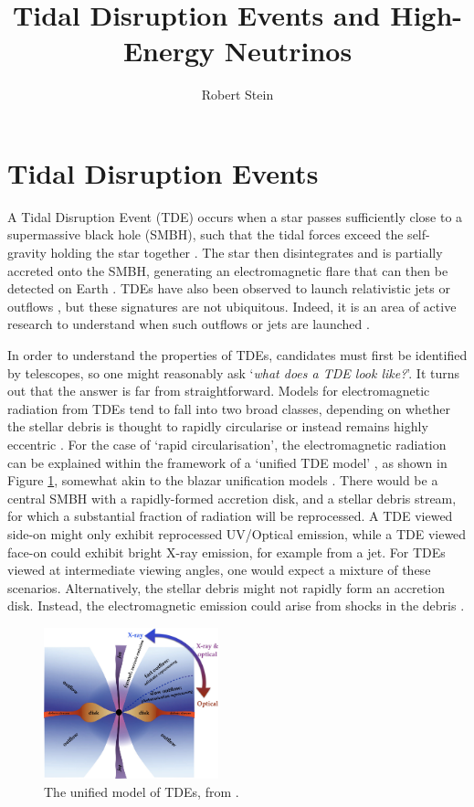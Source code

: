 \documentclass[a4paper,11pt]{article}
\title{Tidal Disruption Events and High-Energy Neutrinos}
\author*[a, b]{Robert Stein}
\affiliation[a]{Deutsches Elektronen-Synchrotron DESY: Zeuthen, Germany}
\affiliation[b]{Institut f\"ur Physik, Humboldt-Universit\"at zu Berlin: Berlin, Germany}
\begin{document}
\maketitle


\section{Tidal Disruption Events}

A Tidal Disruption Event (TDE) occurs when a star passes sufficiently close to a supermassive black hole (SMBH), such that the tidal forces exceed the self-gravity holding the star together \cite{rees_tde_88}. The star then disintegrates and is partially accreted onto the SMBH, generating an electromagnetic flare that can then be detected on Earth \cite{gezari_21}. TDEs have also been observed to launch relativistic jets \cite{swift_j1644_11} or outflows \cite{van_velzen_16, alexander_16, radio_tde_summary}, but these signatures are not ubiquitous. Indeed, it is an area of active research to understand when such outflows or jets are launched \cite{radio_tde_summary}.

In order to understand the properties of TDEs, candidates must first be identified by telescopes, so one might reasonably ask `\emph{what does a TDE look like?}'. It turns out that the answer is far from straightforward. Models for electromagnetic radiation from TDEs tend to fall into two broad classes, depending on whether the stellar debris is thought to rapidly circularise or instead remains highly eccentric \cite{roth_20}. For the case of `rapid circularisation', the electromagnetic radiation can be explained within the framework of a `unified TDE model' \cite{dai_18}, as shown in Figure \ref{fig:tde_dai}, somewhat akin to the blazar unification models \cite{95_agn_unification}. There would be a central SMBH with a rapidly-formed accretion disk, and a stellar debris stream, for which a substantial fraction of radiation will be reprocessed. A TDE viewed side-on might only exhibit reprocessed UV/Optical emission, while a TDE viewed face-on could exhibit bright X-ray emission, for example from a jet. For TDEs viewed at intermediate viewing angles, one would expect a mixture of these scenarios. Alternatively, the stellar debris might not rapidly form an accretion disk. Instead, the electromagnetic emission could arise from shocks in the debris \cite{roth_20}. 

\begin{figure}[!ht]
	\centering \includegraphics[width=0.45\textwidth]{figures/dai_unified_model}
	\caption{The unified model of TDEs, from \cite{dai_18}.}
	\label{fig:tde_dai}
\end{figure}
\end{document}
